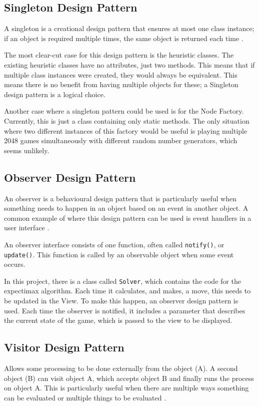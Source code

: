 \documentclass{article}
\begin{document}
\subsection{Singleton Design Pattern}
\label{subsec:singleton}
A singleton is a creational design pattern that ensures at most one class instance; if an object is required multiple times, the same object is returned each time \cite{CS2800_creational}.

The most clear-cut case for this design pattern is the heuristic classes. The existing heuristic classes have no attributes, just two methods. This means that if multiple class instances were created, they would
always be equivalent. This means there is no benefit from having multiple objects for these; a Singleton design pattern is a logical choice.

Another case where a singleton pattern could be used is for the Node Factory. Currently, this is just a class containing only static methods. The only situation where two different instances of this factory would be useful is playing multiple 2048 games simultaneously with different random number generators, which seems unlikely.
\subsection{Observer Design Pattern}
\label{subsec:observer}
An observer is a behavioural design pattern that is particularly useful when something needs to happen in an object based on an event in another object.
A common example of where this design pattern can be used is event handlers in a user interface \cite{CS2800_behavioural}.

An observer interface consists of one function, often called \texttt{notify()}, or \texttt{update()}. This function is called by an observable object when some event occurs.

In this project, there is a class called \texttt{Solver}, which contains the code for the expectimax algorithm. Each time it calculates, and makes, a move, this needs to be updated in the View. To make
this happen, an observer design pattern is used. Each time the observer is notified, it includes a parameter that describes the current state of the game, which is passed to the view to be displayed.
\subsection{Visitor Design Pattern}
\label{subsec:visitor}
Allows some processing to be done externally from the object (A). A second object (B) can visit object A, which accepts object B and finally runs the process on object A.  This is particularly useful when there are multiple ways something can be evaluated or multiple things to be evaluated \cite{CS2800_behavioural}.
\end{document}
